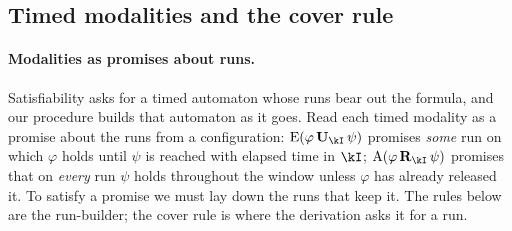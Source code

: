 
\subsection{Timed modalities and the cover rule}\label{sec:timed}

\paragraph{Modalities as promises about runs.}
Satisfiability asks for a timed automaton whose runs bear out the formula, and our procedure builds that
automaton as it goes. Read each timed modality as a promise about the runs from a configuration:
$\mathrm{E}(\varphi\,\mathbf{U}_\kI\,\psi)$ promises \emph{some} run on which $\varphi$ holds until $\psi$
is reached with elapsed time in $\kI$; $\mathrm{A}(\varphi\,\mathbf{R}_\kI\,\psi)$ promises that on
\emph{every} run $\psi$ holds throughout the window unless $\varphi$ has already released it. To satisfy a
promise we must lay down the runs that keep it. The rules below are the run-builder; the cover rule is
where the derivation asks it for a run.


